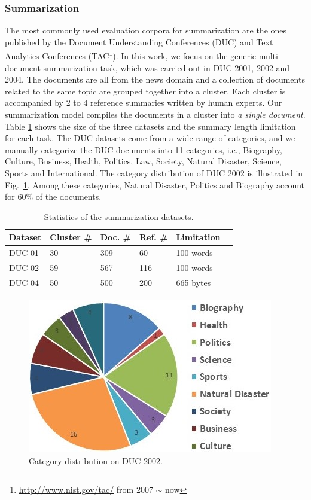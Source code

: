 \documentclass[letterpaper]{article}
\begin{document}
\subsubsection{Summarization}
The most commonly used evaluation corpora for summarization are the ones published by the Document Understanding Conferences (DUC) and Text Analytics Conferences (TAC\footnote{\url{http://www.nist.gov/tac/} from 2007 $\sim$ now}).  
In this work, we focus on the generic multi-document summarization task, which was carried out in DUC 2001, 2002 and 2004. 
The documents are all from the news domain and a collection of documents related to the same topic are grouped together into a cluster.
Each cluster is accompanied by 2 to 4 reference summaries written by human experts.
Our summarization model compiles the documents in a cluster into \textit{a single document}.
Table \ref{TB:dataset} shows the size of the three datasets and the summary length limitation for each task. 
The DUC datasets come from a wide range of categories, and we manually categorize the DUC documents into 11 categories, i.e., Biography, Culture, Business, Health, Politics, Law, Society, Natural Disaster, Science, Sports and International.
The category distribution of DUC 2002 is illustrated in Fig.~\ref{fig:category}.
Among these categories, Natural Disaster, Politics and Biography account for 60\% of the documents.



\begin{table}[ht]
	\centering
	\small
	\begin{tabular}{l|lllll}
		\hline
		Dataset & Cluster \# & Doc. \#  & Ref. \#  &Limitation\\ \hline
		DUC 01  & 30         & 309                & 60    & 100 words       \\ \hline
		DUC 02  & 59         & 567                 & 116   &100 words       \\ \hline
		DUC 04  & 50         & 500                & 200    &665 bytes      \\ \hline
	\end{tabular}
	\caption{Statistics of the summarization datasets.}
	\label{TB:dataset}
\end{table}

\begin{figure}
	\centering
	\includegraphics[width=0.7\linewidth]{CategoryNumber}
	\caption{Category distribution on DUC 2002.}
	\label{fig:category}
\end{figure}
\end{document}
